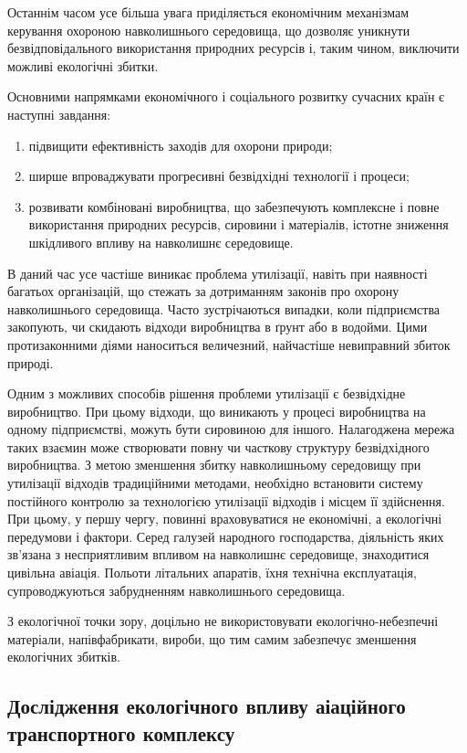 Останнім часом усе більша увага приділяється економічним механізмам керування охороною навколишнього середовища, 
що дозволяє уникнути безвідповідального використання природних ресурсів і, таким чином, виключити можливі екологічні збитки.

Основними напрямками економічного і соціального розвитку сучасних країн є наступні завдання:

\begin{enumerate}
 \item підвищити ефективність заходів для охорони природи;
 \item ширше впроваджувати прогресивні безвідхідні технології і процеси;
 \item розвивати комбіновані виробництва, що забезпечують комплексне і повне використання природних ресурсів, 
сировини і матеріалів, істотне зниження шкідливого впливу на навколишнє середовище.
\end{enumerate}

В даний час усе частіше виникає проблема утилізації, навіть при наявності багатьох організацій, що 
стежать за дотриманням законів про охорону навколишнього середовища. Часто зустрічаються випадки, коли підприємства закопують, чи скидають відходи виробництва в ґрунт або в водойми. Цими протизаконними діями наноситься величезний, найчастіше невиправний збиток природі.

Одним з можливих способів рішення проблеми утилізації є безвідхідне виробництво. При цьому відходи, що виникають у процесі виробництва на одному підприємстві, можуть бути сировиною для іншого. Налагоджена мережа таких взаємин може створювати повну чи часткову структуру безвідхідного виробництва. З метою зменшення збитку навколишньому середовищу при утилізації відходів традиційними методами, необхідно встановити систему постійного контролю за технологією утилізації відходів і місцем її здійснення. При цьому, у першу чергу, повинні враховуватися не економічні, а екологічні передумови і фактори. Серед галузей народного господарства, діяльність яких зв'язана з несприятливим впливом на навколишнє середовище, знаходитися цивільна авіація. Польоти літальних апаратів, їхня технічна експлуатація, супроводжуються забрудненням навколишнього середовища.

З екологічної точки зору, доцільно не використовувати екологічно-небезпечні матеріали, напівфабрикати, вироби, що тим самим забезпечує зменшення екологічних збитків.

\subsection{Дослідження екологічного впливу аіаційного транспортного комплексу}

